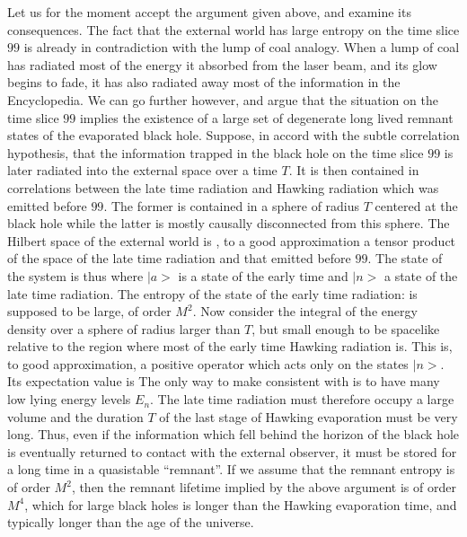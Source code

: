 
Let us for the moment accept the argument given above, and examine its
consequences.
The fact that the external world has large entropy on the time slice
$99$
is already
in contradiction with the lump of coal analogy.  When a lump of coal has
radiated most of the energy it absorbed from the laser beam, and its glow
begins to fade, it has also radiated away most of the information in the
Encyclopedia.
We can go further however, and argue that the situation on the time slice $99$
implies the existence of a large set of degenerate long lived remnant states of
the evaporated black hole.  Suppose, in accord with the subtle correlation
hypothesis,
that the information trapped in the black hole on the time slice $99$
is later radiated into the external space
over a time $T$.  It is then contained in correlations between the late time
radiation and Hawking radiation which was emitted before $99$.  The
former is
contained
in a sphere of radius $T$ centered at the black hole while the latter is mostly causally disconnected from this
 sphere.  The Hilbert space of the external world is , to a good approximation
a tensor product of the space of the late time radiation and that
emitted
before $99$.
The state of the system is thus
\eqn{}
where $\vert a>$ is a state of the early time and $\vert n>$ a state of
the
late
time radiation.
The entropy of the state of the early time radiation:
\eqn{}
is supposed to be large, of order $M^2$.
Now consider the integral of the energy density over a sphere of radius larger
than $T$, but small enough to be spacelike relative to the region where most
of the early time Hawking radiation is.  This is, to good approximation,
a
positive
operator which acts only on the states $\vert n>$.  Its expectation value is
\eqn{}
The only way to make \energy consistent with \entropy is to have many low
lying
energy levels $E_n$.  The late time radiation must therefore
occupy a large volume and the duration $T$ of the last stage of Hawking
evaporation
must be very long.
Thus, even if the information which fell behind the horizon of the black
hole
is
eventually returned to contact with the external observer, it must be stored
for a long time in a quasistable ``remnant''.   If we assume that the remnant
entropy is of order $M^2$, then the remnant lifetime implied by
the above argument is of order $M^4$, which for large black holes is
longer than the Hawking evaporation time, and typically longer than
the age of the universe.

